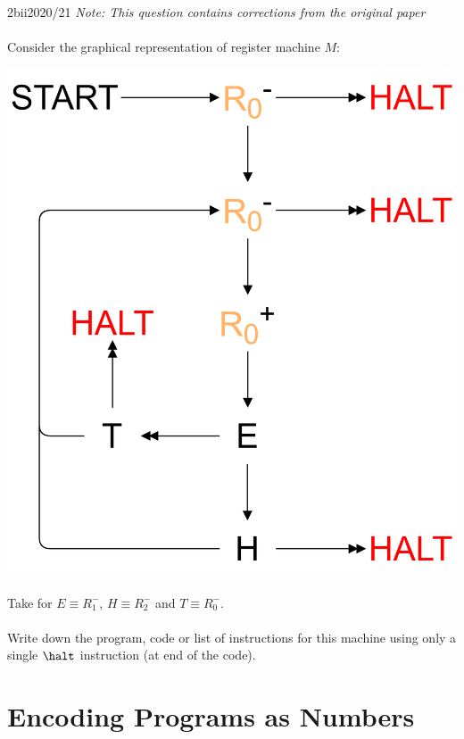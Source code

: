 \begin{exambox}{2bii}{2020/21}
	\textit{Note: This question contains corrections from the original paper}
	\\
	\\ Consider the graphical representation of register machine $M$:
	\begin{center}
		\includegraphics[width=.4\textwidth]{register_machines/images/exam_2bii_2020_2021.drawio.png}
	\end{center}
	Take for $E \equiv R_1^-$, $H \equiv R_2^-$ and $T \equiv R_0^-$.
	\\
	\\ Write down the program, code or list of instructions for this machine using only a single $\halt$ instruction (at end of the code).
\end{exambox}

\section{Encoding Programs as Numbers}

